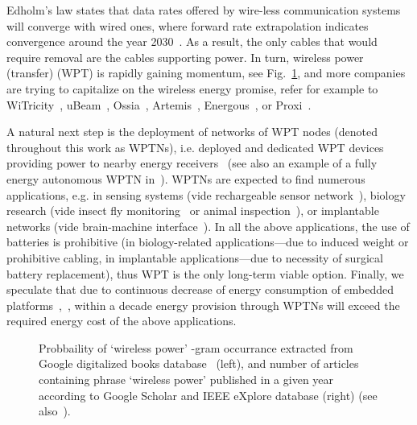 \documentclass[11pt,draftclsnofoot,journal,onecolumn]{IEEEtran}
\begin{document}
Edholm's law states that data rates offered by wire-less communication systems will converge with wired ones, where forward rate extrapolation indicates convergence around the year 2030~\cite{cherry_spectrum_2004}. As a result, the only cables that would require removal are the cables supporting power. In turn, wireless power (transfer) (WPT) is rapidly gaining momentum, see Fig.~\ref{fig:wireless_power_popularity}, and more companies are trying to capitalize on the wireless energy promise, refer for example to WiTricity~\cite{witricity_website}, uBeam~\cite{ubeam_website}, Ossia~\cite{ossia_website}, Artemis~\cite{artemis_website}, Energous~\cite{energous_website}, or Proxi~\cite{proxi_website}. 

A natural next step is the deployment of networks of WPT nodes (denoted throughout this work as WPTNs), i.e. deployed and dedicated WPT devices providing power to nearby energy receivers~\cite{dai_tpds_2014,xie_wcom_2013} (see also an example of a fully energy autonomous WPTN in~\cite[Fig. 1]{wicaksono_vtc_2011}). WPTNs are expected to find numerous applications, e.g. in sensing systems (vide rechargeable sensor network~\cite{he_tmc_2013}), biology research (vide insect fly monitoring~\cite{thomas_jbcs_2012} or animal inspection~\cite{greene_unpublished_2010}), or implantable networks (vide brain-machine interface~\cite{holleman_biocas_2008}). In all the above applications, the use of batteries is prohibitive (in biology-related applications---due to induced weight or prohibitive cabling, in implantable applications---due to necessity of surgical battery replacement), thus WPT is the only long-term viable option. Finally, we speculate that due to continuous decrease of energy consumption of embedded platforms~\cite[Fig. 1]{long_cicc_2008},~\cite[p. 87]{patel_wcm_2010}, within a decade energy provision through WPTNs will exceed the required energy cost of the above applications.

\begin{figure}
\centering
{}
\caption{Probbaility of `wireless power' -gram occurrance extracted from Google digitalized books database~\cite{michael_science_2011} (left), and number of articles containing phrase `wireless power' published in a given year according to Google Scholar and IEEE eXplore database (right) (see also~\cite[Fig. 1]{massa_procieee_2013}).}
\label{fig:wireless_power_popularity}
\end{figure}
\end{document}
